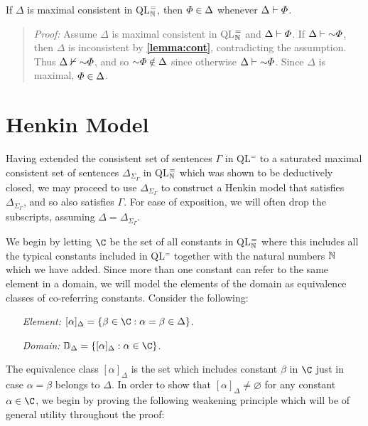 \begin{Lthm} \label{lemma:deductive}
  If $\Delta$ is maximal consistent in QL$^=_{\mathbb{N}}$, then $\varPhi\in\Delta$ whenever $\Delta\vdash\varPhi$.
\end{Lthm}

\begin{quote} 
  \textit{Proof:} Assume $\Delta$ is maximal consistent in QL$^=_{\mathbb{N}}$ and $\Delta\vdash\varPhi$.
  If $\Delta\proves\enot\metaA$, then $\Delta$ is inconsistent by \textbf{\ref{lemma:cont}}, contradicting the assumption.
  Thus $\Delta\nproves\enot\metaA$, and so $\enot\metaA\notin\Delta$ since otherwise $\Delta\proves\enot\metaA$. 
  Since $\Delta$ is maximal, $\varPhi\in\Delta$. 
\end{quote}





\section{Henkin Model}%
  \label{sub:HenkinModel}

Having extended the consistent set of sentences $\Gamma$ in QL$^=$ to a saturated maximal consistent set of sentences $\Delta_{\Sigma_\Gamma}$ in QL$^=_{\mathbb{N}}$ which was shown to be deductively closed, we may proceed to use $\Delta_{\Sigma_\Gamma}$ to construct a Henkin model that satisfies $\Delta_{\Sigma_\Gamma}$, and so also satisfies $\Gamma$.
For ease of exposition, we will often drop the subscripts, assuming $\Delta=\Delta_{\Sigma_\Gamma}$.

We begin by letting $\C$ be the set of all constants in QL$^=_{\mathbb{N}}$ where this includes all the typical constants included in QL$^=$ together with the natural numbers $\mathbb{N}$ which we have added. 
Since more than one constant can refer to the same element in a domain, we will model the elements of the domain as equivalence classes of co-referring constants.
Consider the following:
  \begin{enumerate}[leftmargin=1.5in]
    \item[\it Element:] $[\alpha]_\Delta=\set{\beta\in\C:\alpha=\beta\in\Delta}$.
    \item[\it Domain:] $\D_\Delta=\set{[\alpha]_\Delta:\alpha\in\C}$.
  \end{enumerate}
The equivalence class $[\alpha]_\Delta$ is the set which includes constant $\beta$ in $\C$ just in case $\alpha=\beta$ belongs to $\Delta$.
In order to show that $[\alpha]_\Delta\neq\varnothing$ for any constant $\alpha\in\C$, we begin by proving the following weakening principle which will be of general utility throughout the proof:






